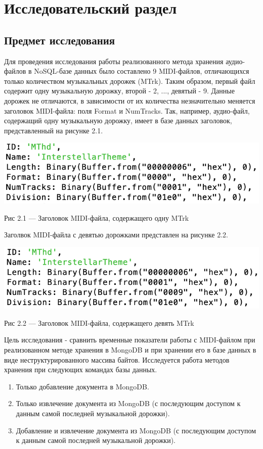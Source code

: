 \chapter{Исследовательский раздел}

\section{Предмет исследования}

Для проведения исследования работы реализованного метода хранения аудио-файлов в NoSQL-базе данных было составлено 9 MIDI-файлов, отличающихся только количеством музыкальных дорожек (MTrk). Таким образом, первый файл содержит одну музыкальную дорожку, второй - 2, ..., девятый - 9. Данные дорожек не отличаются, в зависимости от их количества незначительно меняется заголовок MIDI-файла: поля Format и NumTracks.
Так, например, аудио-файл, содержащий одну музыкальную дорожку, имеет в базе данных заголовок, представленный на рисунке 2.1.

\begin{center}
		\includegraphics[scale=0.6]{tex/img/OneTrack.png}
		
			Рис 2.1 — Заголовок MIDI-файла, содержащего одну MTrk
\end{center}

Заголвок MIDI-файла с девятью дорожками представлен на рисунке 2.2.
\begin{center}
		\includegraphics[scale=0.6]{tex/img/NineTracks.png}
		
			Рис 2.2 — Заголовок MIDI-файла, содержащего девять MTrk
\end{center}

Цель исследования - сравнить временные показатели работы с MIDI-файлом при реализованном методе хранения в MongoDB и при хранении его в базе данных в виде неструктурированного массива байтов. Исследуется работа методов хранения при следующих командах базы данных.
\begin{enumerate}
\item Только добавление документа в MongoDB.
\item Только извлечение документа из MongoDB (с последующим доступом к данным самой последней музыкальной дорожки).
\item Добавление и извлечение документа из MongoDB (с последующим доступом к данным самой последней музыкальной дорожки).
\end{enumerate}


